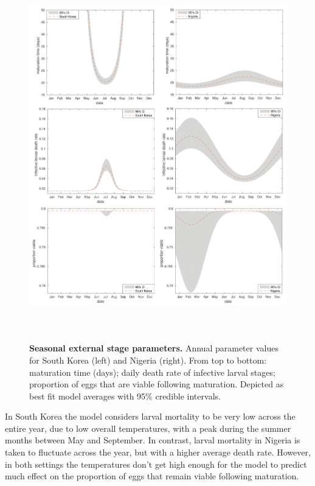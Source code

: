 \begin{figure}[!h]
\includegraphics[height=16cm]{Project/Figures/STH/Fig6.pdf}
\caption{{\bf Seasonal external stage parameters.}
Annual parameter values for South Korea (left) and Nigeria (right). From top to bottom: maturation time (days); daily death rate of infective larval stages; proportion of eggs that are viable following maturation. Depicted as best fit model averages with 95\% credible intervals.}
\label{Fig6}
\end{figure} 

In South Korea the model considers larval mortality to be very low across the entire year, due to low overall temperatures, with a peak during the summer months between May and September. In contrast, larval mortality in Nigeria is taken to fluctuate across the year, but with a higher average death rate. However, in both settings the temperatures don't get high enough for the model to predict much effect on the proportion of eggs that remain viable following maturation.


